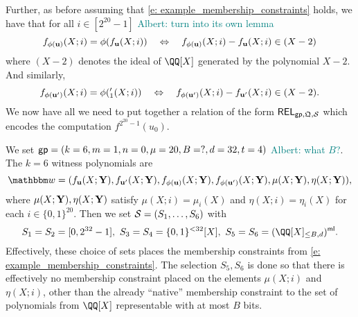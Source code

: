 \documentclass[11pt,letterpaper,usenames,dvipsnames]{article}
\newcommand{\albert}[1]{\textcolor{teal}{Albert: {#1}}}
\begin{document}
Further, as before assuming that \eqref{e: example_membership_constraints} holds, we have that for all $i\in [2^{20}-1]$  \albert{turn into its own lemma}
%
$$
f_{\phi(\mathbf{u})}(X; i) = \phi(f_{\mathbf{u}}(X; i)) \quad \Leftrightarrow\quad f_{\phi(\mathbf{u})}(X;i)-f_{\mathbf{u}}(X;i) \in (X-2) 
$$
where $(X-2)$ denotes the ideal of $\QQ[X]$ generated by the polynomial $X-2$. And similarly,
$$
f_{\phi(\mathbf{u}')}(X; i) = \phi(_1'(X; i)) \quad \Leftrightarrow\quad f_{\phi(\mathbf{u}')}(X;i)-f_{\mathbf{u}'}(X;i) \in (X-2). 
$$
%
% 
We now have all we need to put together a relation of the form $\mathsf{REL}_{\mathsf{gp}, \mathfrak{Q}, \mathcal{S}}$ which encodes the computation $f^{2^{20}-1}(u_0)$.

We set $\mathsf{gp}=(k=6,m=1,n=0,\mu=20, B=?, d=32, t=4)$ \albert{what $B$?}. The $k=6$ witness polynomials are $$\wit=(f_{\uu}(X;\YY), f_{\uu'}(X;\YY), f_{\phi(\uu)}(X;\YY),  f_{\phi(\uu')}(X;\YY), \mu(X;\YY), \eta(X;\YY)),$$ where $\mu(X;\mathbf{Y}), \eta(X;\mathbf{Y})$ satisfy $\mu(X;i)=\mu_i(X)$ and $\eta(X;i)=\eta_i(X)$ for each $i\in \{0,1\}^{20}$. Then we set $\mathcal{S}=(S_1, \ldots, S_6)$ with
%
$$S_1 = S_2 = [0,2^{32}-1],\ S_3=S_4= \{0,1\}^{< 32}[X],\ S_5=S_6=\mainQpolyringmultilin.$$
%
Effectively, these choice of sets places the membership constraints from \cref{e: example_membership_constraints}. The selection $S_5, S_6$ is done so that there is effectively no membership constraint placed on the elements  $\mu(X;i)$ and $\eta(X;i)$, other than the already ``native'' membership constraint to the set of polynomials from $\QQ[X]$ representable with at most $B$ bits.
\end{document}
